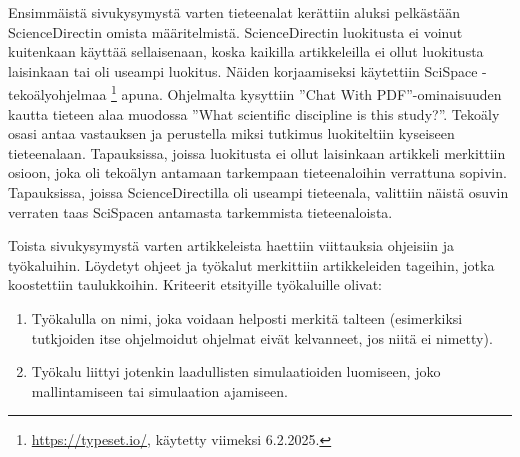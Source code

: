\documentclass[utf8]{gradu3}
\begin{document}
\begin{table}[h]
\centering
{}
\caption{Testiaineistosta johdettu alustava luokittelu tutkimusten tavoitteille}
\label{table: testausera}
\end{table}

Ensimmäistä sivukysymystä varten tieteenalat kerättiin aluksi 
pelkästään ScienceDirectin omista määritelmistä. 
ScienceDirectin luokitusta ei voinut kuitenkaan käyttää sellaisenaan, 
koska kaikilla artikkeleilla ei ollut luokitusta laisinkaan tai oli useampi luokitus. 
Näiden korjaamiseksi käytettiin SciSpace -tekoälyohjelmaa 
\footnote{\url{https://typeset.io/}, käytetty viimeksi 6.2.2025.} apuna.
Ohjelmalta kysyttiin ''Chat With PDF''-ominaisuuden 
kautta tieteen alaa muodossa ''What scientific discipline is this study?''. 
Tekoäly osasi antaa vastauksen ja perustella miksi tutkimus 
luokiteltiin kyseiseen tieteenalaan. 
Tapauksissa, joissa luokitusta ei ollut laisinkaan artikkeli merkittiin osioon,
joka oli tekoälyn antamaan tarkempaan tieteenaloihin verrattuna sopivin.
Tapauksissa, joissa ScienceDirectilla oli useampi tieteenala, valittiin näistä
osuvin verraten taas SciSpacen antamasta tarkemmista tieteenaloista.

Toista sivukysymystä varten artikkeleista haettiin viittauksia ohjeisiin ja työkaluihin. Löydetyt ohjeet ja työkalut merkittiin artikkeleiden tageihin, jotka koostettiin taulukkoihin.
Kriteerit etsityille työkaluille olivat:
\begin{enumerate}
    \item Työkalulla on nimi, joka voidaan helposti merkitä talteen (esimerkiksi tutkjoiden itse ohjelmoidut ohjelmat eivät kelvanneet, jos niitä ei nimetty).
    \item Työkalu liittyi jotenkin laadullisten simulaatioiden luomiseen, joko
    mallintamiseen tai simulaation ajamiseen.
\end{enumerate}
\end{document}

